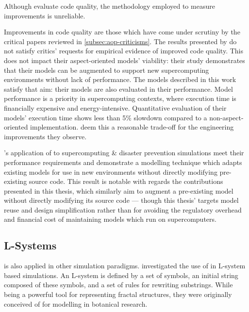 Although \citet{ionescu2009aspect} evaluate code quality, the methodology
employed to measure improvements is unreliable.

Improvements in code quality are those which have come under scrutiny by the
critical papers reviewed in \cref{subsec:aop-criticisms}. The results presented
by \citeauthor{ionescu2009aspect} do not satisfy critics' requests for empirical
evidence of improved code quality. This does not impact their aspect-oriented
models' viability: their study demonstrates that their models can be augmented
to support new supercomputing environments without lack of performance. The
models described in this work satisfy that aim: their models are also evaluated
in their performance. Model performance is a priority in supercomputing
contexts, where execution time is financially expensive and energy-intensive.
Quantitative evaluation of their models' execution time shows less than 5\%
slowdown compared to a non-aspect-oriented implementation.
\citeauthor{ionescu2009aspect} deem this a reasonable trade-off for the
engineering improvements they observe.

\citeauthor{ionescu2009aspect}'s application of \aspectorientation{} to
supercomputing \& disaster prevention simulations meet their performance
requirements and demonstrate a modelling technique which adapts existing models
for use in new environments without directly modifying pre-existing source code.
This result is notable with regards the contributions presented in this thesis, which
similarly aim to augment a pre-existing model without directly modifying its
source code --- though this thesis' targets model reuse and design
simplification rather than for avoiding the regulatory overhead and financial
cost of maintaining models which run on supercomputers.


\subsection{\AspectOriented{} L-Systems}
\Aspectorientation{} is also applied in other simulation paradigms.
\citet{Cieslak_2011} investigated the use of \aspectorientation{} in L-system
based simulations. An L-system\cite{lindenmayer1968lsystem} is defined by a set
of symbols, an initial string composed of these symbols, and a set of rules for
rewriting substrings. While being a powerful tool for representing fractal
structures, they were originally conceived of for modelling in botanical
research.

